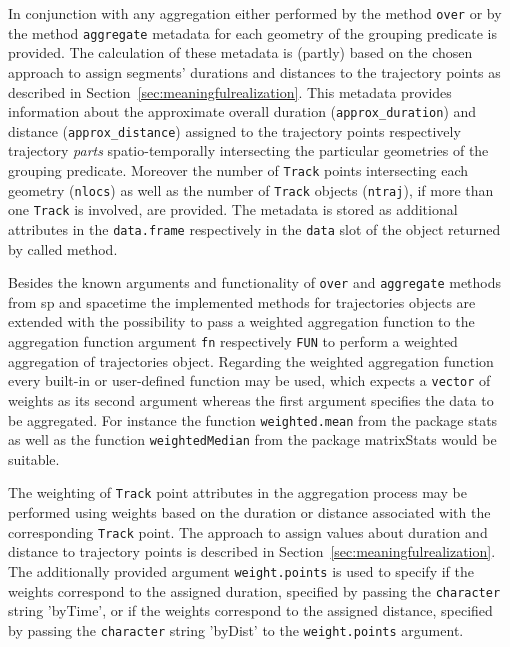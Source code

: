 \documentclass[12pt, oneside, a4paper]{scrbook}
\newcommand{\pkg}[1]{{\normalfont\fontseries{b}\selectfont #1}}
\let\code=\texttt
\begin{document}
In conjunction with any aggregation either performed by the method \code{over} or by the method \code{aggregate} metadata for each geometry of the grouping predicate is provided.
The calculation of these metadata is (partly) based on the chosen approach to assign segments' durations and distances to the trajectory points as described in Section~\ref{sec:meaningfulrealization}. 
This metadata provides information about the approximate overall duration (\code{approx\_duration}) and distance (\code{approx\_distance}) assigned to the trajectory points respectively trajectory \textit{parts} spatio-temporally intersecting the particular geometries of the grouping predicate. 
Moreover the number of \code{Track} points intersecting each geometry (\code{nlocs}) as well as the number of \code{Track} objects (\code{ntraj}), if more than one \code{Track} is involved, are provided.
The metadata is stored as additional attributes in the \code{data.frame} respectively in the \code{data} slot of the object returned by called method.
\par\medskip


Besides the known arguments and functionality of \code{over} and \code{aggregate} methods from \pkg{sp} and \pkg{spacetime} the implemented methods for \pkg{trajectories} objects are extended with the possibility to pass a weighted aggregation function to the aggregation function argument \code{fn} respectively \code{FUN} to perform a weighted aggregation of \pkg{trajectories} object. Regarding the weighted aggregation function every built-in or user-defined function may be used, which expects a \code{vector} of weights as its second argument whereas the first argument specifies the data to be aggregated. For instance the function \code{weighted.mean} from the package \pkg{stats} as well as the function \code{weightedMedian} from the package \pkg{matrixStats} would be suitable.
\par\medskip

The weighting of \code{Track} point attributes in the aggregation process may be performed using weights based on the duration or distance associated with the corresponding \code{Track} point. The approach to assign values about duration and distance to trajectory points is described in Section~\ref{sec:meaningfulrealization}.
The additionally provided argument \code{weight.points} is used to specify if the weights correspond to the assigned duration, specified by passing the \code{character} string 'byTime', or if the weights correspond to the assigned distance, specified by passing the \code{character} string 'byDist' to the \code{weight.points} argument.
\par\medskip
\end{document}
